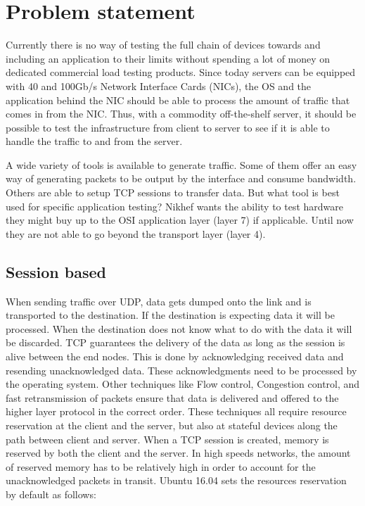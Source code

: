 \chapter{Problem statement}\label{ch:problem}
Currently there is no way of testing the full chain of devices towards and including an application to their limits without spending a lot of money on dedicated commercial load testing products.
Since today servers can be equipped with 40 and 100Gb/s Network Interface Cards (NICs), the OS and the application behind the NIC should be able to process the amount of traffic that comes in from the NIC.
Thus, with a commodity off-the-shelf server, it should be possible to test the infrastructure from client to server to see if it is able to handle the traffic to and from the server.
  
A wide variety of tools is available to generate traffic. Some of them offer an easy way of generating packets to be output by the interface and consume bandwidth. 
Others are able to setup TCP sessions to transfer data. But what tool is best used for specific application testing?   
Nikhef wants the ability to test hardware they might buy up to the OSI application layer (layer 7) if applicable. 
Until now they are not able to go beyond the transport layer (layer 4). 

\section{Session based}\label{sec:sessionbased}
When sending traffic over UDP, data gets dumped onto the link and is transported to the destination. If the destination is expecting data it will be processed.
When the destination does not know what to do with the data it will be discarded. 
TCP guarantees the delivery of the data as long as the session is alive between the end nodes. 
This is done by acknowledging received data and resending unacknowledged data. These acknowledgments need to be processed by the operating system. 
Other techniques like Flow control, Congestion control, and fast retransmission of packets ensure that data is delivered and offered to the higher layer protocol in the correct order. 
These techniques all require resource reservation at the client and the server, but also at stateful devices along the path between client and server. 
When a TCP session is created, memory is reserved by both the client and the server. In high speeds networks, the amount of reserved memory has to be relatively high in order to account for the unacknowledged packets in transit. 
Ubuntu 16.04 sets the resources reservation by default as follows:

